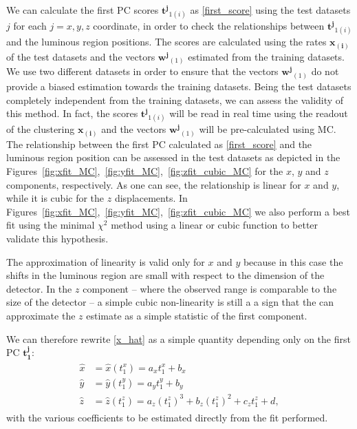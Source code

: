  We can calculate the first PC scores $\mathbf{t^j}_{1(i)}$ as \eqref{first_score} using the test datasets $j$ for each $j=x,y,z$ coordinate, in order to check the relationships between $\mathbf{t^{j}}_{1(i)}$ and the luminous region positions. The scores are calculated using the rates $\mathbf{x_{(i)}}$ of the test datasets and the vectors $\mathbf{w^{j}}_{(1)}$ estimated from the training datasets. We use two different datasets in order to ensure that the vectors $\mathbf{w^{j}}_{(1)}$ do not provide a biased estimation towards the training datasets. Being the test datasets completely independent from the training datasets, we can assess the validity of this method. In fact, the scores $\mathbf{t^{j}}_{1(i)}$ will be read in real time using the readout of the clustering $\mathbf{x_{(i)}}$ and the vectors $\mathbf{w^{j}}_{(1)}$ will be pre-calculated using MC. The relationship between the first PC calculated as \eqref{first_score} and the luminous region position can be assessed in the test datasets as depicted in the Figures~\ref{fig:xfit_MC},~\ref{fig:yfit_MC},~\ref{fig:zfit_cubic_MC} for the $x$, $y$ and $z$ components, respectively. As one can see, the relationship is linear for $x$ and $y$, while it is cubic for the $z$ displacements. In Figures~\ref{fig:xfit_MC},~\ref{fig:yfit_MC},~\ref{fig:zfit_cubic_MC} we also perform a best fit using the minimal $\chi^2$ method using a linear or cubic function to better validate this hypothesis. 

The approximation of linearity is valid only for $x$ and $y$ because in this case the shifts in the luminous region are small with respect to the dimension of the detector. In the $z$ component -- where the observed range is comparable to the size of the detector -- a simple cubic non-linearity is still a a sign that the can approximate the $z$ estimate as a simple statistic of the first component. 


We can therefore rewrite \eqref{x_hat} as a simple quantity depending only on the first PC $\mathbf{t^j_1}$:
\begin{align}
\begin{split}
    \hat{x} &= \hat{x}(t^x_1) = a_x t^x_1 + b_x \\
    \hat{y} &= \hat{y}(t^y_1) = a_y t^y_1 + b_y \\\label{x_hat_true}
    \hat{z} &= \hat{z}(t^z_1) = a_z (t^z_1)^3 + b_z (t^z_1)^2 + c_z  t^z_1 + d,
    \end{split}
\end{align} 
with the various coefficients to be estimated directly from the fit performed. 

